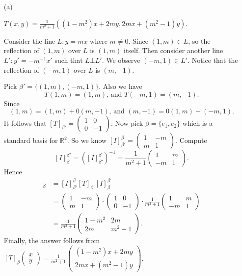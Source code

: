 \begin{Exercise}
\begin{enumerate}[(a)]
\item[(a)]
\begin{answer}
$T(x,y) = \frac{1}{m^2+1}\left((1-m^2)x+2m y,2m x+(m^2-1)y\right)$.
\end{answer}
\begin{solution}
Consider the line $L:y=m x$ where $m\neq 0$. Since $(1,m)\in L$, so the reflection of $(1,m)$ over $L$ is $(1,m)$ itself. Then consider another line $L':y'=-m^{-1} x'$ such that $L\bot L'$. We observe $(-m,1)\in L'$. Notice that the reflection of $(-m,1)$ over $L$ is $(m,-1)$.

Pick $\beta' = \{(1,m),(-m,1)\}$. Also we have
$$
T(1,m) = (1,m)\text{, and } T(-m,1) = (m,-1).
$$
Since 
$$
(1,m) = (1,m)+0(m,-1) \text{, and } (m,-1) = 0(1,m)-(-m,1).
$$
It follows that $[T]_{\beta'} = \begin{pmatrix}
1 & 0 \\
0 & -1
\end{pmatrix}$. Now pick $\beta = \{e_1,e_2\}$ which is a standard basis for $\mathbb{R}^2$. So we know $[I]_{\beta'}^{\beta} = \begin{pmatrix}
1 & -m \\
m & 1
\end{pmatrix}$. Compute 
$$
[I]_{\beta}^{\beta'} = ([I]_{\beta'}^{\beta})^{-1} = \frac{1}{m^2+1}\begin{pmatrix}
1 & m \\
-m & 1
\end{pmatrix}.
$$
Hence
\begin{align*}
[T]_{\beta} 
&= [I]_{\beta'}^{\beta} [T]_{\beta'} [I]_{\beta}^{\beta'} \\
&= \begin{pmatrix}
1 & -m \\
m & 1
\end{pmatrix} \cdot \begin{pmatrix}
1 & 0 \\
0 & -1
\end{pmatrix} \cdot \frac{1}{m^2+1}\begin{pmatrix}
1 & m \\
-m & 1
\end{pmatrix} \\
&= \frac{1}{m^2+1}\begin{pmatrix}
1-m^2 & 2m \\
2m & m^2-1
\end{pmatrix}.
\end{align*}
Finally, the answer follows from $[T]_{\beta}\begin{pmatrix}
x \\
y
\end{pmatrix} = \frac{1}{m^2+1}\begin{pmatrix}
(1-m^2)x+2m y \\
2m x + (m^2-1) y
\end{pmatrix}$.
\end{solution}


\end{enumerate}
\end{Exercise}
